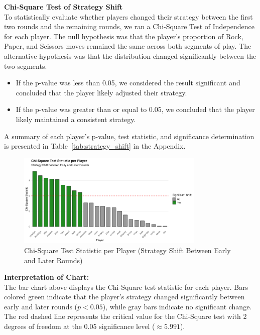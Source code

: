 \documentclass[12pt]{article}
\begin{document}
\vspace{1em}

\noindent\textbf{Chi-Square Test of Strategy Shift}\\
To statistically evaluate whether players changed their strategy between the first two rounds and the remaining rounds, we ran a Chi-Square Test of Independence for each player. The null hypothesis was that the player’s proportion of Rock, Paper, and Scissors moves remained the same across both segments of play. The alternative hypothesis was that the distribution changed significantly between the two segments.

\begin{itemize}
    \item If the p-value was less than 0.05, we considered the result significant and concluded that the player likely adjusted their strategy.
    \item If the p-value was greater than or equal to 0.05, we concluded that the player likely maintained a consistent strategy.
\end{itemize}

\noindent A summary of each player’s p-value, test statistic, and significance determination is presented in Table~\ref{tab:strategy_shift} in the Appendix.

\vspace{1em}
\begin{figure}[H]
\centering
\includegraphics[width=0.8\textwidth]{figures/strategy_shift_chisq.png}
\caption{Chi-Square Test Statistic per Player (Strategy Shift Between Early and Later Rounds)}
\label{fig:strategy_shift_bar}
\end{figure}

\noindent\textbf{Interpretation of Chart:}\\
The bar chart above displays the Chi-Square test statistic for each player. Bars colored green indicate that the player's strategy changed significantly between early and later rounds ($p < 0.05$), while gray bars indicate no significant change. The red dashed line represents the critical value for the Chi-Square test with 2 degrees of freedom at the 0.05 significance level ($\approx 5.991$).
\end{document}
